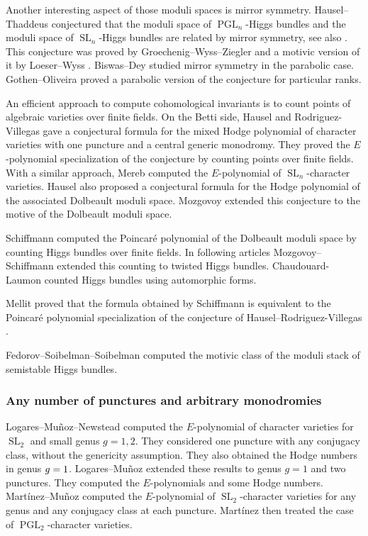 \documentclass[JEP,XML,SOM,NoEqCountersInSection,Unicode,published]{cedram}
\theoremstyle{definition}
\theoremstyle{plain}
\DeclareMathOperator{\SL}{SL}
\DeclareMathOperator{\PGL}{PGL}
\begin{document}
Another interesting aspect of those moduli spaces is mirror symmetry. Hausel--Thaddeus \cite{Hausel_Thaddeus_mirror01,Hausel_Thaddeus_mirror} conjectured that the moduli space of $\PGL_n$-Higgs bundles and the moduli space of $\SL_n$-Higgs bundles are related by mirror symmetry, see also \cite{Hausel_mirror}. This conjecture was proved by Groechenig--Wyss--Ziegler \cite{Groechenig_Wyss_Ziegler_mirror} and a motivic version of it by Loeser--Wyss \cite{Loeser_Wyss}. Biswas--Dey \cite{Biswas_Dey} studied mirror symmetry in the parabolic case.
Gothen--Oliveira \cite{Gothen_Oliveira} proved a parabolic version of the conjecture for particular ranks.

An efficient approach to compute cohomological invariants is to count points of algebraic varieties over finite fields. On the Betti side, Hausel and Rodriguez-Villegas \cite{Hausel_Villegas} gave a conjectural formula for the mixed Hodge polynomial of character varieties with one puncture and a central generic monodromy. They proved the $E$\nobreakdash-poly\-nomial specialization of the conjecture by counting points over finite fields. With a similar approach, Mereb \cite{Mereb} computed the $E$-polynomial of $\SL_n$-character varieties. Hausel \cite{Hausel_mirror} also proposed a conjectural formula for the Hodge polynomial of the associated Dolbeault moduli space. Mozgovoy \cite{Mozgovoy12} extended this conjecture to the motive of the Dolbeault moduli space.

Schiffmann \cite{Schiffmann16} computed the Poincaré polynomial of the Dolbeault moduli space by counting Higgs bundles over finite fields. In following articles \cite{Mozgovoy_Schiffmann_14,Mozgovoy_Schiffmann_2020} Mozgovoy--Schiffmann extended this counting to twisted Higgs bundles. Chaudouard-Laumon \cite{Chaudouard_Laumon_2016} counted Higgs bundles using automorphic forms.

Mellit \cite{Mellit2017} proved that the formula obtained by Schiffmann \cite{Schiffmann16} is equivalent to the Poincaré polynomial specialization of the conjecture of Hausel--Rodriguez-Villegas \cite{Hausel_Villegas}.

Fedorov--Soibelman--Soibelman \cite{Fedorov_Soibelman_Soibelman} computed the motivic class of the moduli stack of semistable Higgs bundles.

\subsubsection{Any number of punctures and arbitrary monodromies}
Logares--Muñoz--New\-stead \cite{Logares_Munoz_Newstead} computed the $E$-polynomial of character varieties for $\SL_2$ and small genus $g=1,2$. They considered one puncture with any conjugacy class, without the genericity assumption. They also obtained the Hodge numbers in genus $g=\nobreak1$.
Logares--Muñoz \cite{Logares_Munoz} extended these results to genus $g=1$ and two punctures. They computed the $E$-polynomials and some Hodge numbers.
Martínez--Muñoz \cite{Martinez_Munoz_14,Martinez_Munoz_14_b} computed the $E$-polynomial of $\SL_2$-character varieties for any genus and any conjugacy class at each puncture. Martínez \cite{Martinez2017} then treated the case of $\PGL_2$-character varieties.
\end{document}
